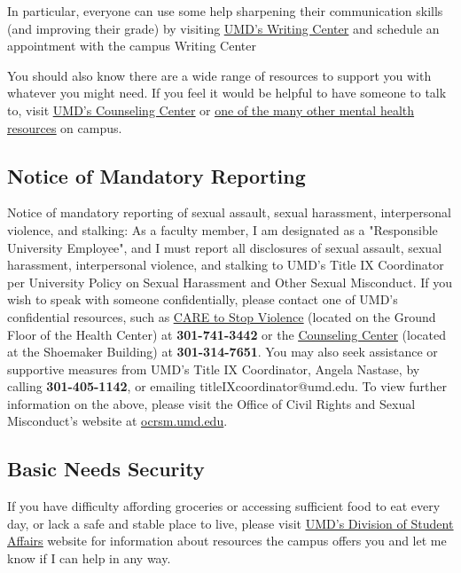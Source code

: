 \documentclass[11pt,usenames,dvipsnames,svgnames,x11names,letterpaper]{article}
\newcommand{\urllink}[2]{\href{#1}{\textcolor{Tomato3}{{{\tiny\faChevronRight}\uline{#2}}}}}
\begin{document}
\vspace{0.3cm}
In particular, everyone can use some help sharpening their communication skills (and improving their grade) by
visiting \urllink{https://english.umd.edu/writing-programs/writing-center}{UMD's Writing Center} and schedule an appointment with the campus Writing Center

\vspace{0.3cm}
You should also know there are a wide range of resources to support you with whatever you might need. If you feel
it would be helpful to have someone to talk to, visit \urllink{https://counseling.umd.edu/}{UMD's Counseling Center} or \urllink{https://tltc.umd.edu/instructors/teaching-topics/supporting-whole-student}{one of the many other mental
health resources} on campus.


\subsection{Notice of Mandatory Reporting}
Notice of mandatory reporting of sexual assault, sexual harassment, interpersonal violence, and stalking: As a
faculty member, I am designated as a "Responsible University Employee", and I must report all disclosures of sexual
assault, sexual harassment, interpersonal violence, and stalking to UMD's Title IX Coordinator per University Policy
on Sexual Harassment and Other Sexual Misconduct.
If you wish to speak with someone confidentially, please contact one of UMD's confidential resources, such as \urllink{https://health.umd.edu/CARE}{CARE
to Stop Violence} (located on the Ground Floor of the Health Center) at \textbf{301-741-3442} or the \urllink{https://counseling.umd.edu/}{Counseling Center}
(located at the Shoemaker Building) at \textbf{301-314-7651}.
You may also seek assistance or supportive measures from UMD's Title IX Coordinator, Angela Nastase, by calling
\textbf{301-405-1142}, or emailing titleIXcoordinator@umd.edu.
To view further information on the above, please visit the Office of Civil Rights and Sexual Misconduct's website at
\urllink{https://ocrsm.umd.edu/}{ocrsm.umd.edu}.


\subsection{Basic Needs Security}
If you have difficulty affording groceries or accessing sufficient food to eat every day, or lack a safe and stable place
to live, please visit \urllink{https://studentaffairs.umd.edu/basic-needs-security}{UMD's Division of Student Affairs} website for information about resources the campus offers
you and let me know if I can help in any way.
\end{document}
